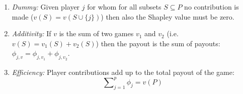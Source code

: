 {\begin{enumerate}
\begin{enumerate}
        then the Shapley values should be identical.
        \item \textit{Dummy:} Given player $j$ for whom for all subsets $S \subseteq P$ no contribution is made ($v(S) = v(S \cup \{j\})$) then also the Shapley value must be zero.
        \item \textit{Additivity:} If $v$ is the sum of two games $v_1$ and $v_2$ (i.e. $v(S) = v_1(S) + v_2(S)$) then the payout is the sum of payouts: $\phi_{j,v} = \phi_{j,v_1} + \phi_{j, v_2}$.
        \item \textit{Efficiency:} Player contributions add up to the total payout of the game:
            $$\sum\nolimits_{j=1}^p\phi_j = v(P)$$
    \end{enumerate}
\end{enumerate}

}
